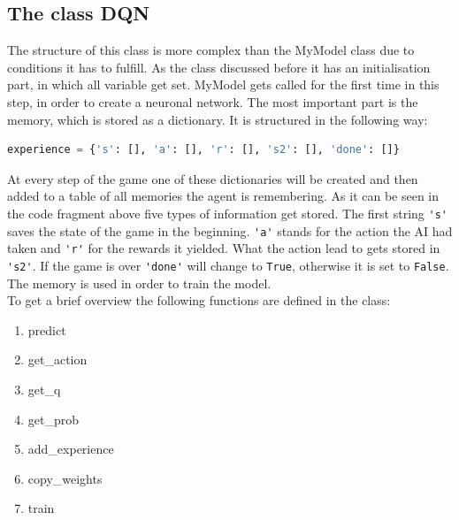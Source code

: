 \documentclass[12pt]{article}
\begin{document}
\subsection{The class DQN}\label{ssec:DQN}
The structure of this class is more complex than the MyModel class due to conditions it has to fulfill. As the class discussed before it has an initialisation part, in which all variable get set. MyModel gets called for the first time in this step, in order to create a \gls{neuronal network}. The most important part is the \gls{memory}, which is stored as a dictionary. It is structured in the following way:
\begin{lstlisting}[language=Python, caption = Example - The \gls{memory} of the \gls{neuronal network}]
experience = {'s': [], 'a': [], 'r': [], 's2': [], 'done': []}
\end{lstlisting}
At every step of the game one of these dictionaries will be created and then added to a table of all memories the agent is remembering.
As it can be seen in the code fragment above five types of information get stored. The first string \lstinline{'s'} saves the \gls{state} of the game in the beginning. \lstinline{'a'} stands for the action the \gls{AI} had taken and \lstinline{'r'} for the \glspl{reward} it yielded. What the action lead to gets stored in \lstinline{'s2'}. If the game is over \lstinline{'done'} will change to \lstinline{True}, otherwise it is set to \lstinline{False}. The \gls{memory} is used in order to train the model. \\ To get a brief overview the following functions are defined in the class:
\begin{enumerate}
    \item predict
    \item get\_action
    \item get\_q
    \item get\_prob
    \item add\_experience
    \item copy\_weights
    \item train
\end{enumerate}
\end{document}

